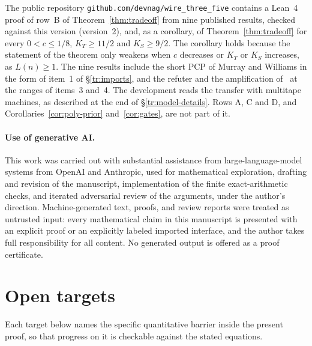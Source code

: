 \documentclass[11pt,letterpaper]{article}
\theoremstyle{definition}
\theoremstyle{remark}
\begin{document}
The public repository \nolinkurl{github.com/devnag/wire_three_five}
contains a Lean~4 proof of row~B of Theorem~\ref{thm:tradeoff} from
nine published results, checked against this version (version~2),
and, as a corollary, of Theorem~\ref{thm:tradeoff} for every
$0<c\le1/8$, $K_T\ge11/2$ and $K_S\ge9/2$. The corollary holds because
the statement of the theorem only weakens when $c$ decreases or $K_T$
or $K_S$ increases, as $L(n)\ge1$. The nine results include the short
PCP of Murray and Williams in the form of item~1 of \S\ref{tr:imports},
and the refuter and the amplification of~\cite{CLW} at the ranges of
items~3 and~4. The development reads the transfer with multitape
machines, as described at the end of \S\ref{tr:model-details}. Rows A,
C and D, and Corollaries~\ref{cor:poly-prior} and~\ref{cor:gates}, are
not part of it.

\paragraph{Use of generative AI.}
This work was carried out with substantial assistance from
large-language-model systems from OpenAI and Anthropic, used for
mathematical exploration, drafting and revision of the manuscript,
implementation of the finite exact-arithmetic checks, and iterated
adversarial review of the arguments, under the author's direction.
Machine-generated text, proofs, and review reports were treated as
untrusted input: every mathematical claim in this manuscript is
presented with an explicit proof or an explicitly labeled imported
interface, and the author takes full responsibility for all content.
No generated output is offered as a proof certificate.

\section{Open targets}
\label{sec:open}

Each target below names the specific quantitative barrier inside the
present proof, so that progress on it is checkable against the stated
equations.
\end{document}
